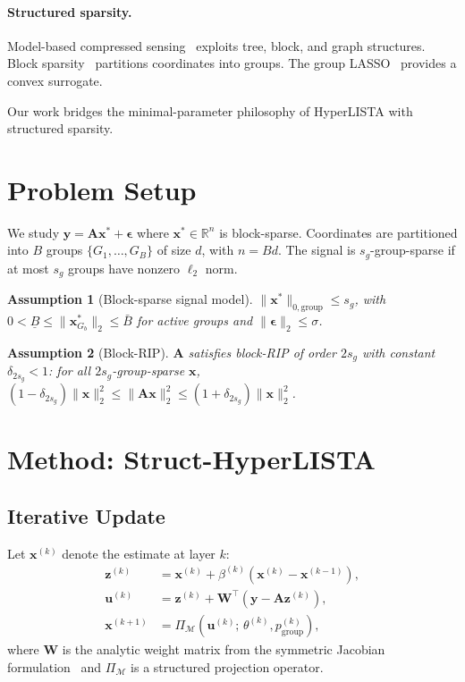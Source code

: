 \documentclass{article}
\newtheorem{assumption}{Assumption}
\begin{document}
\paragraph{Structured sparsity.} Model-based compressed sensing~\cite{baraniuk2010model} exploits tree, block, and graph structures. Block sparsity~\cite{eldar2010block,stojnic2009block} partitions coordinates into groups. The group LASSO~\cite{yuan2006group} provides a convex surrogate.

Our work bridges the minimal-parameter philosophy of HyperLISTA with structured sparsity.

\section{Problem Setup}

We study $\mathbf{y} = \mathbf{A}\mathbf{x}^* + \boldsymbol{\epsilon}$ where $\mathbf{x}^* \in \mathbb{R}^n$ is block-sparse. Coordinates are partitioned into $B$ groups $\{G_1, \ldots, G_B\}$ of size $d$, with $n = Bd$. The signal is $s_g$-group-sparse if at most $s_g$ groups have nonzero $\ell_2$ norm.

\begin{assumption}[Block-sparse signal model]
\label{assump:signal}
$\|\mathbf{x}^*\|_{0,\text{group}} \leq s_g$, with $0 < \underline{B} \leq \|\mathbf{x}^*_{G_b}\|_2 \leq \bar{B}$ for active groups and $\|\boldsymbol{\epsilon}\|_2 \leq \sigma$.
\end{assumption}

\begin{assumption}[Block-RIP]
\label{assump:brip}
$\mathbf{A}$ satisfies block-RIP of order $2s_g$ with constant $\delta_{2s_g} < 1$: for all $2s_g$-group-sparse $\mathbf{x}$,
$(1 - \delta_{2s_g})\|\mathbf{x}\|_2^2 \leq \|\mathbf{A}\mathbf{x}\|_2^2 \leq (1 + \delta_{2s_g})\|\mathbf{x}\|_2^2$.
\end{assumption}
\section{Method: Struct-HyperLISTA}

\subsection{Iterative Update}

Let $\mathbf{x}^{(k)}$ denote the estimate at layer $k$:
\begin{align}
\mathbf{z}^{(k)} &= \mathbf{x}^{(k)} + \beta^{(k)}(\mathbf{x}^{(k)} - \mathbf{x}^{(k-1)}), \label{eq:momentum} \\
\mathbf{u}^{(k)} &= \mathbf{z}^{(k)} + \mathbf{W}^\top(\mathbf{y} - \mathbf{A}\mathbf{z}^{(k)}), \label{eq:gradient} \\
\mathbf{x}^{(k+1)} &= \Pi_{\mathcal{M}}(\mathbf{u}^{(k)};\, \theta^{(k)}, p^{(k)}_{\text{group}}), \label{eq:projection}
\end{align}
where $\mathbf{W}$ is the analytic weight matrix from the symmetric Jacobian formulation~\cite{chen2021hyperlista} and $\Pi_{\mathcal{M}}$ is a structured projection operator.
\end{document}
